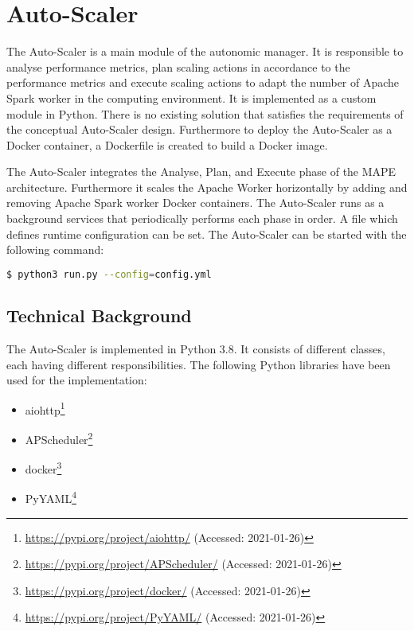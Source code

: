 \section{Auto-Scaler}
The Auto-Scaler is a main module of the autonomic manager. It is responsible to analyse performance metrics, plan scaling actions in accordance to the performance metrics and execute scaling actions to adapt the number of Apache Spark worker in the computing environment.
It is implemented as a custom module in Python. There is no existing solution that satisfies the requirements of the conceptual Auto-Scaler design.
Furthermore to deploy the Auto-Scaler as a Docker container, a Dockerfile is created to build a Docker image.


The Auto-Scaler integrates the Analyse, Plan, and Execute phase of the MAPE architecture. Furthermore it scales the Apache Worker horizontally by adding and removing Apache Spark worker Docker containers.
The Auto-Scaler runs as a background services that periodically performs each phase in order.
A file which defines runtime configuration can be set.
The Auto-Scaler can be started with the following command:
\begin{lstlisting}[label=lst:06_auto-scaler_start, caption=Auto-Scaler start command, language=sh]
$ python3 run.py --config=config.yml
\end{lstlisting}


\subsection{Technical Background}
The Auto-Scaler is implemented in Python 3.8. It consists of different classes, each having different responsibilities.
The following Python libraries have been used for the implementation:
\begin{itemize}
\item aiohttp\footnote{\url{https://pypi.org/project/aiohttp/} (Accessed: 2021-01-26)}
\item APScheduler\footnote{\url{https://pypi.org/project/APScheduler/} (Accessed: 2021-01-26)}
\item docker\footnote{\url{https://pypi.org/project/docker/} (Accessed: 2021-01-26)}
\item PyYAML\footnote{\url{https://pypi.org/project/PyYAML/} (Accessed: 2021-01-26)}
\end{itemize}


